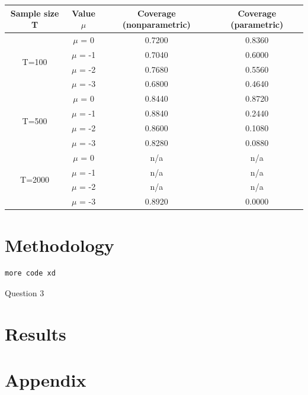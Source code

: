 \documentclass[12pt]{article}
\begin{document}
\begin{center}
\begin{tabular}{||c | c | c c||} 
 \hline
 Sample size T & Value $\mu$ & Coverage (nonparametric) & Coverage (parametric) \\ [0.5ex] 
 \hline\hline
 \multirow{4}{4em}{T=100} & $\mu$ = 0 & 0.7200 & 0.8360\\ 
& $\mu$ = -1 & 0.7040 & 0.6000 \\ 
& $\mu$ = -2 & 0.7680 & 0.5560 \\ 
& $\mu$ = -3 & 0.6800 & 0.4640 \\ 
 \hline
 \multirow{4}{4em}{T=500} & $\mu$ = 0 & 0.8440 & 0.8720\\ 
& $\mu$ = -1 & 0.8840 & 0.2440 \\ 
& $\mu$ = -2 & 0.8600 & 0.1080 \\ 
& $\mu$ = -3 & 0.8280 & 0.0880 \\ 
 \hline
 \multirow{4}{4em}{T=2000} & $\mu$ = 0 & n/a & n/a\\ 
& $\mu$ = -1 & n/a & n/a \\ 
& $\mu$ = -2 & n/a & n/a \\ 
& $\mu$ = -3 & 0.8920 & 0.0000 \\ 
 \hline
\end{tabular}
\end{center}


\newpage
\section{Methodology}

\begin{Program}[!htb]
\begin{lstlisting}[style=Matlab-editor,basicstyle=\mlttfamily\footnotesize]
more code xd
\end{lstlisting}
\caption{Question 3 }
\label{Question 3 }
\end{Program}

\section{Results}

\newpage
\section{Appendix}
\end{document}
